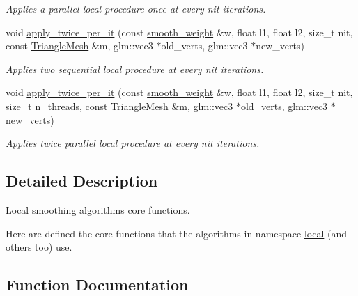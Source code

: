 \begin{DoxyCompactItemize}
\begin{DoxyCompactList}\small\item\em Applies a parallel local procedure once at every {\itshape nit} iterations. \end{DoxyCompactList}\item 
void \hyperlink{namespacegeoproc_1_1smoothing_1_1local__private_a2b21fd90516602c4986ef3a39a58d079}{apply\+\_\+twice\+\_\+per\+\_\+it} (const \hyperlink{namespacegeoproc_1_1smoothing_a76e43f405426c150569712512de58028}{smooth\+\_\+weight} \&w, float l1, float l2, size\+\_\+t nit, const \hyperlink{classgeoproc_1_1TriangleMesh}{Triangle\+Mesh} \&m, glm\+::vec3 $\ast$old\+\_\+verts, glm\+::vec3 $\ast$new\+\_\+verts)
\begin{DoxyCompactList}\small\item\em Applies two sequential local procedure at every {\itshape nit} iterations. \end{DoxyCompactList}\item 
void \hyperlink{namespacegeoproc_1_1smoothing_1_1local__private_a68d179e0f5a942106f85ddffd10d8c53}{apply\+\_\+twice\+\_\+per\+\_\+it} (const \hyperlink{namespacegeoproc_1_1smoothing_a76e43f405426c150569712512de58028}{smooth\+\_\+weight} \&w, float l1, float l2, size\+\_\+t nit, size\+\_\+t n\+\_\+threads, const \hyperlink{classgeoproc_1_1TriangleMesh}{Triangle\+Mesh} \&m, glm\+::vec3 $\ast$old\+\_\+verts, glm\+::vec3 $\ast$new\+\_\+verts)
\begin{DoxyCompactList}\small\item\em Applies twice parallel local procedure at every {\itshape nit} iterations. \end{DoxyCompactList}\end{DoxyCompactItemize}


\subsection{Detailed Description}
Local smoothing algorithms core functions. 

Here are defined the core functions that the algorithms in namespace \hyperlink{namespacegeoproc_1_1smoothing_1_1local}{local} (and others too) use. 

\subsection{Function Documentation}
\mbox{\label{namespacegeoproc_1_1smoothing_1_1local__private_a39385a162edb351605f8d4e304bea74f}} 
